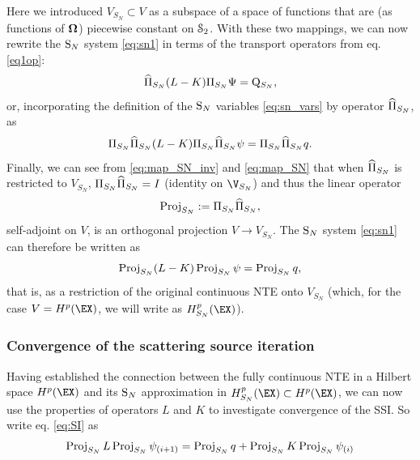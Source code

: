 Here we introduced $V_{S_N}\subset V$ as a subspace of a space of functions that are (as functions of $\bomega$)
piecewise constant on $\Sphere$. With these two mappings, we can now rewrite the $\SN$ system
\eqref{eq:sn1} in terms of the transport operators from eq.
\eqref{eq1op}:
\begin{equation}\label{eq:sn_op}
	\PihSN (\op{L} - \op{K}) \PiSN \Psi = \mathrm{Q}_{S_N},
\end{equation}
or, incorporating the definition of the $\SN$ variables \eqref{eq:sn_vars} by operator $\PihSN$, as
\begin{equation}\label{eq:sn_op2}
	\PiSN \PihSN (\op{L} - \op{K})\PiSN \PihSN \psi = \PiSN \PihSN q.
\end{equation} 
Finally, we can see from \eqref{eq:map_SN_inv} and \eqref{eq:map_SN} that when $\PihSN$ is restricted to $V_{S_N}$, 
$\PiSN\PihSN = I$ (identity on $\V_{S_N}$) and thus the linear operator
$$
	\Projop[S_N] := \PiSN\PihSN,
$$
self-adjoint on $V$, is an orthogonal projection $V\to V_{S_N}$. The $\SN$ system \eqref{eq:sn1} can
therefore be written as
\begin{equation}\label{eq:sn_op}
	\Projop[S_N] (\op{L} - \op{K})\Projop[S_N] \psi = \Projop[S_N] q,
\end{equation}
that is, as a restriction of the original continuous NTE onto $V_{S_N}$ (which, for the case $V = \Hp(\EX)$, we will
write as $\Hp_{S_N}(\EX)$).

\subsubsection{Convergence of the scattering source iteration} \label{sec:SI}
Having established the connection between the fully continuous NTE in a Hilbert space $\Hp(\EX)$ and its $\SN$
approximation in $\Hp_{S_N}(\EX) \subset \Hp(\EX)$, we can now use the properties of operators $L$ and $K$ to
investigate convergence of the SSI. So write eq. \eqref{eq:SI} as
$$
	\Projop[S_N] \op{L} \Projop[S_N] \psi_{(i+1)} = \Projop[S_N] q + \Projop[S_N] \op{K} \Projop[S_N] \psi_{(i)} 
$$


\begin{lemma}

\end{lemma}

